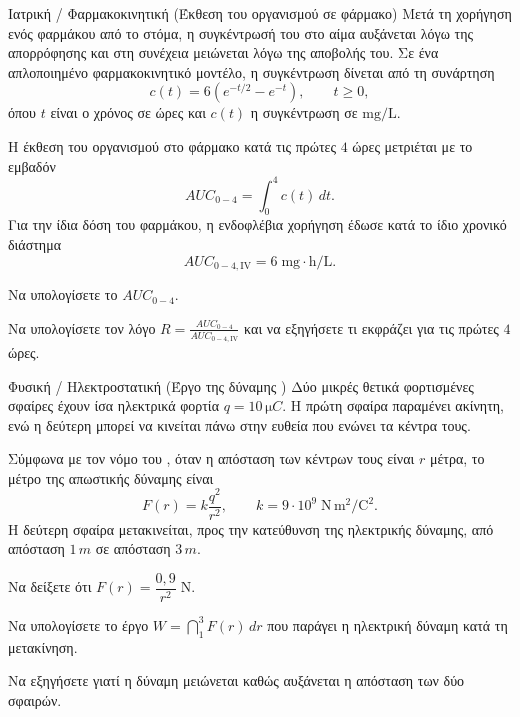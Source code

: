 \begin{problhma}{Ιατρική / Φαρμακοκινητική (Έκθεση του οργανισμού σε φάρμακο)}
Μετά τη χορήγηση ενός φαρμάκου από το στόμα, η συγκέντρωσή του στο
αίμα αυξάνεται λόγω της απορρόφησης και στη συνέχεια μειώνεται λόγω
της αποβολής του. Σε ένα απλοποιημένο φαρμακοκινητικό μοντέλο, η
συγκέντρωση δίνεται από τη συνάρτηση
\[
  c(t)=6\left(e^{-t/2}-e^{-t}\right),\qquad t\geq 0,
\]
όπου $t$ είναι ο χρόνος σε ώρες και $c(t)$ η συγκέντρωση σε
$\mathrm{mg/L}$.

Η έκθεση του οργανισμού στο φάρμακο κατά τις πρώτες $4$ ώρες
μετριέται με το εμβαδόν
\[
  AUC_{0-4}=\int_0^4 c(t)\,dt.
\]
Για την ίδια δόση του φαρμάκου, η ενδοφλέβια χορήγηση έδωσε κατά το
ίδιο χρονικό διάστημα \cite{garrett1994bateman,fda2022bioavailability}
\[
  AUC_{0-4,\mathrm{IV}}=6\;\mathrm{mg\cdot h/L}.
\]

\begin{alist}
\item Να υπολογίσετε το $AUC_{0-4}$.
\item Να υπολογίσετε τον λόγο $R=\frac{AUC_{0-4}}{AUC_{0-4,\mathrm{IV}}}$
      και να εξηγήσετε τι εκφράζει για τις πρώτες $4$ ώρες.
\end{alist}
\end{problhma}

\begin{problhma}{Φυσική / Ηλεκτροστατική (Έργο της δύναμης )}
Δύο μικρές θετικά φορτισμένες σφαίρες έχουν ίσα ηλεκτρικά φορτία
$q=10\,\si{\micro C}$. Η πρώτη σφαίρα παραμένει ακίνητη, ενώ η δεύτερη
μπορεί να κινείται πάνω στην ευθεία που ενώνει τα κέντρα τους.

Σύμφωνα με τον νόμο του , όταν η απόσταση των κέντρων τους είναι
$r$ μέτρα, το μέτρο της απωστικής δύναμης \cite{ling2016universityPhysics2} είναι 
\[
  F(r)=k\frac{q^2}{r^2},
  \qquad
  k=9\cdot10^9\;\mathrm{N\,m^2/C^2}.
\]
Η δεύτερη σφαίρα μετακινείται, προς την κατεύθυνση της ηλεκτρικής
δύναμης, από απόσταση $1\,\si{m}$ σε απόσταση $3\,\si{m}$.
\begin{alist}
  \item Να δείξετε ότι $F(r)=\dfrac{0{,}9}{r^2}\;\mathrm{N}.$
        
  \item Να υπολογίσετε το έργο $W=\dint_1^3 F(r)\,dr$ που παράγει η ηλεκτρική δύναμη κατά τη μετακίνηση.
  \item Να εξηγήσετε γιατί η δύναμη μειώνεται καθώς αυξάνεται η
        απόσταση των δύο σφαιρών.
\end{alist}
\end{problhma}

